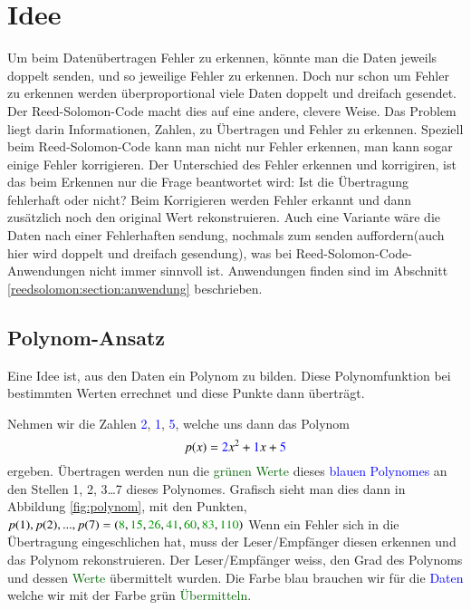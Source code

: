 %
%
\section{Idee
\label{reedsolomon:section:idee}}
Um beim Datenübertragen Fehler zu erkennen, könnte man die Daten jeweils doppelt senden,
und so jeweilige Fehler zu erkennen.
Doch nur schon um Fehler zu erkennen werden überproportional viele Daten doppelt und dreifach gesendet.
Der Reed-Solomon-Code macht dies auf eine andere, clevere Weise.
Das Problem liegt darin Informationen, Zahlen, 
zu Übertragen und Fehler zu erkennen.
Speziell beim Reed-Solomon-Code kann man nicht nur Fehler erkennen, 
man kann sogar einige Fehler korrigieren.
Der Unterschied des Fehler erkennen und korrigiren, ist das beim Erkennen nur die Frage beantwortet wird: Ist die Übertragung fehlerhaft oder nicht?
Beim Korrigieren werden Fehler erkannt und dann zusätzlich noch den original Wert rekonstruieren.
Auch eine Variante wäre die Daten nach einer Fehlerhaften sendung, nochmals zum senden auffordern(auch hier wird doppelt und dreifach gesendung), 
was bei Reed-Solomon-Code-Anwendungen nicht immer sinnvoll ist. 
Anwendungen finden sind im Abschnitt 
\ref{reedsolomon:section:anwendung} beschrieben.

\subsection{Polynom-Ansatz
\label{reedsolomon:section:polynomansatz}}
Eine Idee ist, aus den Daten ein Polynom zu bilden.
Diese Polynomfunktion bei bestimmten Werten errechnet und diese Punkte dann überträgt.
\begin{beispiel} Nehmen wir die Zahlen \textcolor{blue}{2}, \textcolor{blue}{1}, \textcolor{blue}{5},
welche uns dann das Polynom 
\begin{equation}
p(x)
=
\textcolor{blue}{2}x^2 + \textcolor{blue}{1}x + \textcolor{blue}{5}
\label{reedsolomon:equation1}
\end{equation}
ergeben.
Übertragen werden nun die \textcolor{darkgreen}{grünen Werte} 
dieses \textcolor{blue}{blauen Polynomes} an den Stellen 1, 2, 3\dots 7 dieses Polynomes.
Grafisch sieht man dies dann in Abbildung \ref{fig:polynom}, 
mit den Punkten, $p(1),p(2),...,p(7) = (\textcolor{darkgreen}{8}, 
\textcolor{darkgreen}{15}, \textcolor{darkgreen}{26},
\textcolor{darkgreen}{41}, \textcolor{darkgreen}{60}, 
\textcolor{darkgreen}{83}, \textcolor{darkgreen}{110})$
Wenn ein Fehler sich in die Übertragung eingeschlichen hat, muss der Leser/Empfänger diesen erkennen und das Polynom rekonstruieren.
Der Leser/Empfänger weiss, den Grad des Polynoms und dessen \textcolor{darkgreen}{Werte} übermittelt wurden. 
Die Farbe blau brauchen wir für die \textcolor{blue}{Daten} welche wir mit der Farbe grün \textcolor{darkgreen}{Übermitteln}.
\end{beispiel}

